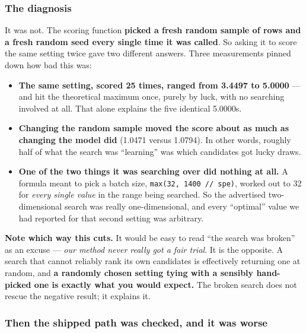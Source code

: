 \documentclass[11pt]{article}
\begin{document}
\subsubsection*{The diagnosis} It was not. The scoring function \textbf{picked a fresh random sample of
rows and a fresh random seed every single time it was called}. So asking it to score the same setting
twice gave two different answers. Three measurements pinned down how bad this was:

\begin{itemize}
  \item \textbf{The same setting, scored 25 times, ranged from 3.4497 to 5.0000} --- and hit the
  theoretical maximum once, purely by luck, with no searching involved at all. That alone explains the
  five identical 5.0000s.
  \item \textbf{Changing the random sample moved the score about as much as changing the model did}
  (1.0471 versus 1.0794). In other words, roughly half of what the search was ``learning'' was
  which candidates got lucky draws.
  \item \textbf{One of the two things it was searching over did nothing at all.} A formula meant to
  pick a batch size, \texttt{max(32, 1400 // spe)}, worked out to 32 for \emph{every single value} in
  the range being searched. So the advertised two-dimensional search was really one-dimensional, and
  every ``optimal'' value we had reported for that second setting was arbitrary.
\end{itemize}

\textbf{Note which way this cuts.} It would be easy to read ``the search was broken'' as an excuse ---
\emph{our method never really got a fair trial}. It is the opposite. A search that cannot reliably rank
its own candidates is effectively returning one at random, and \textbf{a randomly chosen setting tying
with a sensibly hand-picked one is exactly what you would expect.} The broken search does not rescue the
negative result; it explains it.

\subsubsection*{Then the shipped path was checked, and it was worse}
\end{document}
